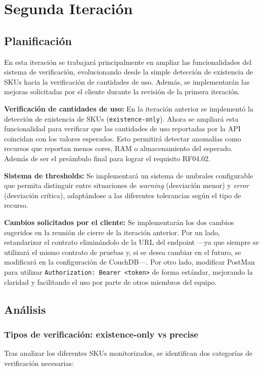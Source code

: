 \section{Segunda Iteración}
\subsection{Planificación}
En esta iteración se trabajará principalmente en ampliar las funcionalidades del sistema de verificación, evolucionando desde la simple detección de existencia de SKUs hacia la verificación de cantidades de uso. Además, se implementarán las mejoras solicitadas por el cliente durante la revisión de la primera iteración.

\textbf{Verificación de cantidades de uso:} En la iteración anterior se implementó la detección de existencia de SKUs (\texttt{existence-only}). Ahora se ampliará esta funcionalidad para verificar que las cantidades de uso reportadas por la API coincidan con los valores esperados. Esto permitirá detectar anomalías como recursos que reportan menos cores, RAM o almacenamiento del esperado. Además de ser el preámbulo final para lograr el requisito RF04.02. 

\textbf{Sistema de thresholds:} Se implementará un sistema de umbrales configurable que permita distinguir entre situaciones de \textit{warning} (desviación menor) y \textit{error} (desviación crítica), adaptándose a las diferentes tolerancias según el tipo de recurso.

\textbf{Cambios solicitados por el cliente:} Se implementarán los dos cambios sugeridos en la reunión de cierre de la iteración anterior. Por un lado, estandarizar el contrato eliminándolo de la URL del endpoint ---ya que siempre se utilizará el mismo contrato de pruebas y, si se desea cambiar en el futuro, se modificará en la configuración de CouchDB---. Por otro lado, modificar PostMan para utilizar \texttt{Authorization: Bearer <token>} de forma estándar, mejorando la claridad y facilitando el uso por parte de otros miembros del equipo.


\subsection{Análisis} 

\subsubsection{Tipos de verificación: existence-only vs precise}
Tras analizar los diferentes SKUs monitorizados, se identifican dos categorías de verificación necesarias:


